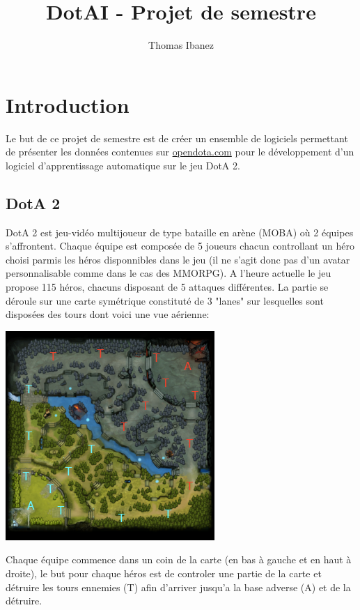 \documentclass{article}
\title{DotAI - Projet de semestre}
\author{Thomas Ibanez}
\begin{document}
\maketitle
\newpage
\section{Introduction}

Le but de ce projet de semestre est de créer un ensemble de logiciels permettant de présenter les données contenues sur \url{opendota.com} pour le développement d'un logiciel d'apprentissage automatique sur le jeu DotA 2.

\subsection{DotA 2}

DotA 2 est jeu-vidéo multijoueur de type bataille en arène (MOBA) où 2 équipes s'affrontent. Chaque équipe est composée de 5 joueurs chacun controllant un héro choisi parmis les héros disponnibles dans le jeu (il ne s'agit donc pas d'un avatar personnalisable comme dans le cas des MMORPG). A l'heure actuelle le jeu propose 115 héros, chacuns disposant de 5 attaques différentes. La partie se déroule sur une carte symétrique constituté de 3 "lanes" sur lesquelles sont disposées des tours dont voici une vue aérienne: \\
\begin{center}
	\includegraphics[scale=1]{"minimap.png"} 
\end{center}

Chaque équipe commence dans un coin de la carte (en bas à gauche et en haut à droite), le but pour chaque héros est de controler une partie de la carte et détruire les tours ennemies (T) afin d'arriver jusqu'a la base adverse (A) et de la détruire.\\
\end{document}
